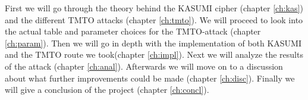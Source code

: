 First we will  go through the theory
behind the KASUMI cipher (chapter \ref{ch:kas}) and the different TMTO
attacks (chapter \ref{ch:tmto}). We will proceed to look into the
actual table and parameter choices for the TMTO-attack (chapter
\ref{ch:param}). Then we will go in depth with the
implementation of both KASUMI and the TMTO route we took(chapter
\ref{ch:impl}). Next we will analyze the results of the attack
(chapter \ref{ch:anal}). Afterwards we will move on to a discussion
about what further improvements could be made (chapter
\ref{ch:disc}). Finally we will give a conclusion of the project
(chapter \ref{ch:concl}).

